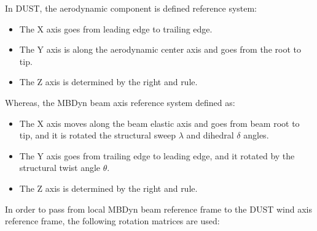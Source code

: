 In DUST, the aerodynamic component is defined reference system: 
\begin{itemize}
    \item The X axis goes from leading edge to trailing edge. 
    \item The Y axis is along the aerodynamic center axis and goes from the root to tip.
    \item The Z axis is determined by the right and rule.
\end{itemize}
Whereas, the MBDyn beam axis reference system defined as: 
\begin{itemize}
  \item The X axis moves along the beam elastic axis and goes from beam root to tip, and it is rotated the structural sweep $\lambda$ and dihedral $\delta$ angles.
  \item The Y axis goes from trailing edge to leading edge, and it rotated by the structural twist angle $\theta$. 
  \item The Z axis is determined by the right and rule.
\end{itemize}

In order to pass from local MBDyn beam reference frame to the DUST wind axis reference frame, the following rotation matrices are used: 

